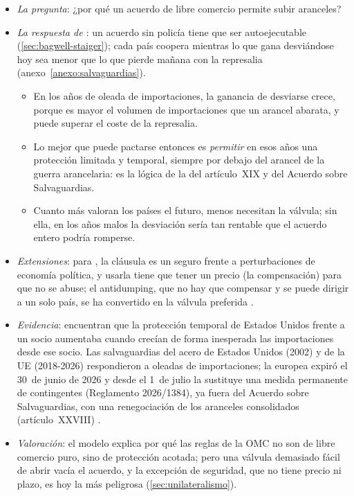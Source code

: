 \documentclass[11pt]{article}
\begin{document}
\begin{itemize}
\item \emph{La pregunta}: ¿por qué un acuerdo de libre comercio permite subir aranceles?
\item \emph{La respuesta de \textcite{BagwellStaiger1990Managed}}: un acuerdo sin policía tiene que ser autoejecutable (\ref{sec:bagwell-staiger}); cada país coopera mientras lo que gana desviándose hoy sea menor que lo que pierde mañana con la represalia (anexo~\ref{anexo:salvaguardias}).
  \begin{itemize}
  \item En los años de oleada de importaciones, la ganancia de desviarse crece, porque es mayor el volumen de importaciones que un arancel abarata, y puede superar el coste de la represalia.
  \item Lo mejor que puede pactarse entonces es \emph{permitir} en esos años una protección limitada y temporal, siempre por debajo del arancel de la guerra arancelaria: es la lógica de la  del artículo~XIX y del Acuerdo sobre Salvaguardias.
  \item Cuanto más valoran los países el futuro, menos necesitan la válvula; sin ella, en los años malos la desviación sería tan rentable que el acuerdo entero podría romperse.
  \end{itemize}
\item \emph{Extensiones}: para \textcite{RosendorffMilner2001}, la cláusula es un seguro frente a perturbaciones de economía política, y usarla tiene que tener un precio (la compensación) para que no se abuse; el antidumping, que no hay que compensar y se puede dirigir a un solo país, se ha convertido en la válvula preferida .
\item \emph{Evidencia}: \textcite{BownCrowley2013} encuentran que la protección temporal de Estados Unidos frente a un socio aumentaba cuando crecían de forma inesperada las importaciones desde ese socio. Las salvaguardias del acero de Estados Unidos (2002) y de la UE (2018-2026) respondieron a oleadas de importaciones; la europea expiró el 30~de junio de 2026 y desde el 1~de julio la sustituye una medida permanente de contingentes (Reglamento 2026/1384), ya fuera del Acuerdo sobre Salvaguardias, con una renegociación de los aranceles consolidados (artículo~XXVIII) .
\item \emph{Valoración}: el modelo explica por qué las reglas de la OMC no son de libre comercio puro, sino de protección acotada; pero una válvula demasiado fácil de abrir vacía el acuerdo, y la excepción de seguridad, que no tiene precio ni plazo, es hoy la más peligrosa (\ref{sec:unilateralismo}).
\end{itemize}
\end{document}
